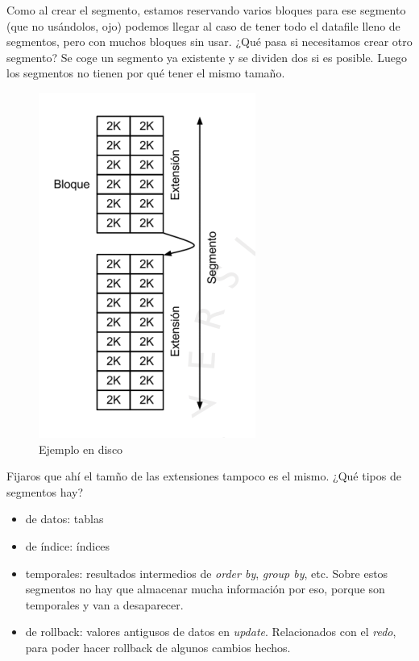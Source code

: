 Como al crear el segmento, estamos reservando varios bloques para ese segmento (que no usándolos, ojo) podemos llegar al caso de tener todo el datafile lleno de segmentos, pero con muchos bloques sin usar. ¿Qué pasa si necesitamos crear otro segmento? Se coge un segmento ya existente y se dividen dos si es posible. Luego los segmentos no tienen por qué tener el mismo tamaño.

\begin{figure}[H]
  \center
  \includegraphics[scale=0.4]{img/14.png}
  \caption{Ejemplo en disco}
\end{figure}

Fijaros que ahí el tamño de las extensiones tampoco es el mismo. ¿Qué tipos de segmentos hay?
\begin{itemize}
\item de datos: tablas
\item de índice: índices
\item temporales: resultados intermedios de \textit{order by}, \textit{group by}, etc. Sobre estos segmentos no hay que almacenar mucha información por eso, porque son temporales y van a desaparecer.
\item de rollback: valores antigusos de datos en \textit{update}. Relacionados con el \textit{redo}, para poder hacer rollback de algunos cambios hechos.
\end{itemize}

